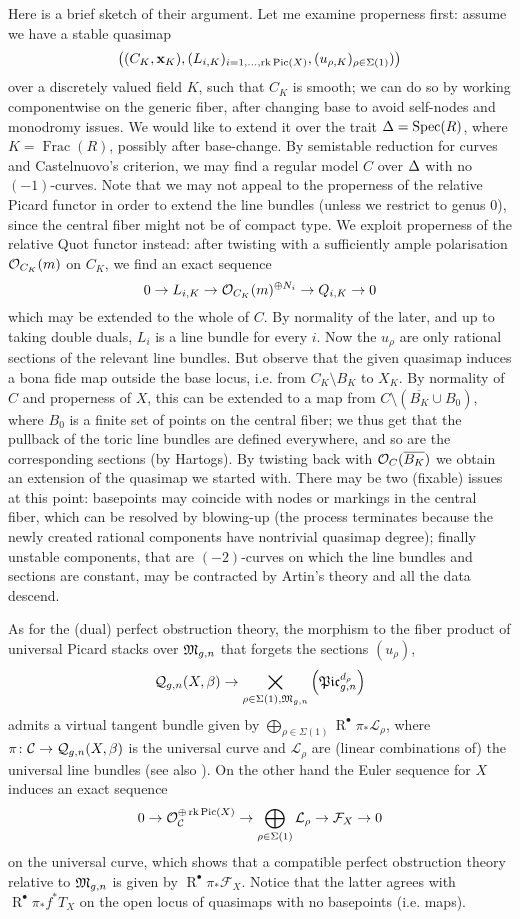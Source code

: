 Here is a brief sketch of their argument. Let me examine properness first: assume we have a stable quasimap \[\left((C_K,\mathbf x_K), (L_{i,K})_{i=1,\ldots,\operatorname{rk}\operatorname{Pic}(X)},(u_{\rho,K})_{\rho\in\Sigma(1)})\right)\] over a discretely valued field $K$, such that $C_K$ is smooth; we can do so by working componentwise on the generic fiber, after changing base to avoid self-nodes and monodromy issues. We would like to extend it over the trait $\Delta=\operatorname{Spec}(R)$, where $K=\operatorname{Frac}(R)$, possibly after base-change. By semistable reduction for curves and Castelnuovo's criterion, we may find a regular model $C$ over $\Delta$ with no $(-1)$-curves. Note that we may not appeal to the properness of the relative Picard functor in order to extend the line bundles (unless we restrict to genus $0$), since the central fiber might not be of compact type. We exploit properness of the relative Quot functor instead: after twisting with a sufficiently ample polarisation $\mathcal{O}_{C_K}(m)$ on $C_K$, we find an exact sequence
\[ 0 \rightarrow L_{i,K} \rightarrow \mathcal{O}_{C_K}(m)^{\oplus N_i} \rightarrow Q_{i,K}\rightarrow 0 \]
which may be extended to the whole of $C$. By normality of the later, and up to taking double duals, $L_i$ is a line bundle for every $i$. Now the $u_\rho$ are only rational sections of the relevant line bundles. But observe that the given quasimap induces a bona fide map outside the base locus, i.e. from $C_K\setminus B_K$ to $X_K$. By normality of $C$ and properness of $X$, this can be extended to a map from $C\setminus(\overline{B_K}\cup B_0)$, where $B_0$ is a finite set of points on the central fiber; we thus get that the pullback of the toric line bundles are defined everywhere, and so are the corresponding sections (by Hartogs). By twisting back with $\mathcal{O}_C(\overline{B_K})$ we obtain an extension of the quasimap we started with. There may be two (fixable) issues at this point: basepoints may coincide with nodes or markings in the central fiber, which can be resolved by blowing-up (the process terminates because the newly created rational components have nontrivial quasimap degree); finally unstable components, that are $(-2)$-curves on which the line bundles and sections are constant, may be contracted by Artin's theory and all the data descend.

As for the (dual) perfect obstruction theory, the morphism to the fiber product of universal Picard stacks over $\mathfrak M_{g,n}$ that forgets the sections $(u_\rho)$,
\[\mathcal{Q}_{g,n}(X,\beta) \rightarrow \bigtimes_{\rho\in\Sigma(1),\mathfrak M_{g,n}}\left(\mathfrak{Pic}^{d_{\rho}}_{g,n}\right)\]
admits a virtual tangent bundle given by $\bigoplus_{\rho\in\Sigma(1)} \operatorname R^\bullet\pi_*\mathcal L_\rho$, where $\pi\colon \mathcal C\rightarrow \mathcal{Q}_{g,n}(X,\beta)$ is the universal curve and $\mathcal L_\rho$ are (linear combinations of) the universal line bundles (see also \cites{Jie, CL-pfields}). On the other hand the Euler sequence for $X$ induces an exact sequence
\[ 0\rightarrow \mathcal{O}_{\mathcal C}^{\oplus\operatorname{rk}\operatorname{Pic}(X)}\rightarrow \bigoplus_{\rho\in\Sigma(1)}\mathcal L_\rho\rightarrow\mathcal F_X\rightarrow 0\]
on the universal curve, which shows that a compatible perfect obstruction theory relative to $\mathfrak M_{g,n}$ is given by $\operatorname R^\bullet\pi_*\mathcal F_X$. Notice that the latter agrees with $\operatorname R^\bullet\pi_*f^*T_X$ on the open locus of quasimaps with no basepoints (i.e. maps).

